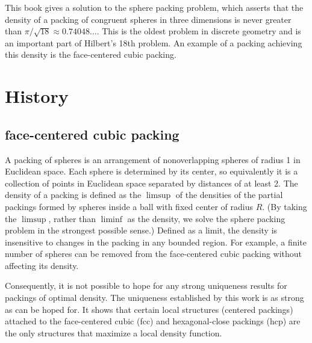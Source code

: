 









This book gives a solution to the sphere packing
problem,  which asserts that the density of a packing of
congruent spheres in three dimensions is never greater than
$\pi/\sqrt{18}\approx 0.74048\ldots$. This is the oldest problem
in discrete geometry and is an important part of Hilbert's 18th
problem. An example of a packing achieving this density is the
face-centered cubic packing.


\section{History}
\label{sec:intro-review}

\subsection{face-centered cubic packing}

A packing of spheres is an arrangement of
nonoverlapping spheres of radius 1 in Euclidean space.
Each sphere is determined by its center, so equivalently it is a collection
of points in Euclidean space separated by distances of at least 2.
The density of a packing is defined as the $\limsup$ of
the densities of the partial packings formed by spheres inside
a ball with fixed center of radius $R$.
(By taking the $\limsup$,
rather than $\liminf$ as the density, we solve the sphere packing problem
in the strongest possible sense.)
Defined as a limit, the density
is insensitive to changes in the packing in any bounded region.
For example, a finite number of spheres can be removed from the
face-centered cubic packing without affecting its density.

Consequently, it is not possible to hope for any strong uniqueness
results for packings of optimal density.  The uniqueness
established by this work is as strong as can be hoped for. It
shows that certain local structures (centered packings) attached
to the face-centered cubic (fcc) and hexagonal-close packings
(hcp) are the only structures that maximize a local density
function.

